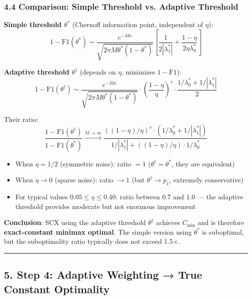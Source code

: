 \documentclass[
  12pt,
]{ctexart}
\providecommand{\tightlist}{%
  \setlength{\itemsep}{0pt}\setlength{\parskip}{0pt}}
\begin{document}
\subsubsection{4.4 Comparison: Simple Threshold vs. Adaptive Threshold}\label{comparison-simple-threshold-vs-adaptive-threshold}

\textbf{Simple threshold \(\theta^*\)} (Chernoff information point, independent of \(\eta\)):
\[1 - \text{F1}(\theta^*) \sim \frac{e^{-M\kappa}}{\sqrt{2\pi M\theta^*(1-\theta^*)}} \left[\frac{1}{2|\lambda_1^*|} + \frac{1-\eta}{2\eta\lambda_0^*}\right]\]

\textbf{Adaptive threshold \(\theta^\dagger\)} (depends on \(\eta\), minimizes \(1-\text{F1}\)):
\[1 - \text{F1}(\theta^\dagger) \sim \frac{e^{-M\kappa}}{\sqrt{2\pi M\theta^*(1-\theta^*)}} \cdot \left(\frac{1-\eta}{\eta}\right)^s \cdot \frac{1/\lambda_0^* + 1/|\lambda_1^*|}{2}\]

Their ratio:
\[\frac{1 - \text{F1}(\theta^\dagger)}{1 - \text{F1}(\theta^*)} \xrightarrow{M\to\infty} \frac{((1-\eta)/\eta)^s \cdot (1/\lambda_0^* + 1/|\lambda_1^*|)}{1/|\lambda_1^*| + ((1-\eta)/\eta) \cdot 1/\lambda_0^*}\]

\begin{itemize}
\tightlist
\item
  When \(\eta = 1/2\) (symmetric noise): ratio \(= 1\) (\(\theta^\dagger = \theta^*\), they are equivalent)
\item
  When \(\eta \to 0\) (sparse noise): ratio \(\to 1\) (but \(\theta^\dagger \to p_1\), extremely conservative)
\item
  For typical values \(0.05 \leq \eta \leq 0.40\): ratio between \(0.7\) and \(1.0\) --- the adaptive threshold provides moderate but not enormous improvement
\end{itemize}

\textbf{Conclusion}: SCX using the adaptive threshold \(\theta^\dagger\) achieves \(C_{\min}\) and is therefore \textbf{exact-constant minimax optimal}. The simple version using \(\theta^*\) is suboptimal, but the suboptimality ratio typically does not exceed 1.5\(\times\).

\begin{center}\rule{0.5\linewidth}{0.5pt}\end{center}

\subsection{5. Step 4: Adaptive Weighting → True Constant Optimality}\label{step-4-adaptive-weighting-true-constant-optimality}
\end{document}
